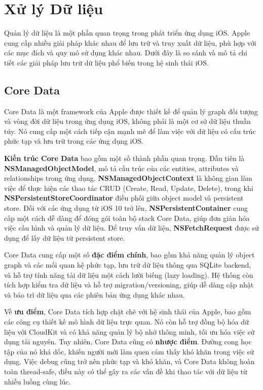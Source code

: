 \section{Xử lý Dữ liệu}

\hspace*{0.8cm}Quản lý dữ liệu là một phần quan trọng trong phát triển ứng dụng iOS. Apple cung cấp nhiều giải pháp khác nhau để lưu trữ và truy xuất dữ liệu, phù hợp với các mục đích và quy mô sử dụng khác nhau. Dưới đây là so sánh và mô tả chi tiết các giải pháp lưu trữ dữ liệu phổ biến trong hệ sinh thái iOS.


\subsection{Core Data}
Core Data\cite{Core-Data} là một framework của Apple được thiết kế để quản lý graph đối tượng và vòng đời dữ liệu trong ứng dụng iOS, không phải là một cơ sở dữ liệu thuần túy. Nó cung cấp một cách tiếp cận mạnh mẽ để làm việc với dữ liệu có cấu trúc phức tạp và lưu trữ trong các ứng dụng iOS.

\textbf{Kiến trúc Core Data} bao gồm một số thành phần quan trọng. Đầu tiên là \textbf{NSManagedObjectModel}, mô tả cấu trúc của các entities, attributes và relationships trong ứng dụng. \textbf{NSManagedObjectContext} là không gian làm việc để thực hiện các thao tác CRUD (Create, Read, Update, Delete), trong khi \textbf{NSPersistentStoreCoordinator} điều phối giữa object model và persistent store. Đối với các ứng dụng từ iOS 10 trở lên, \textbf{NSPersistentContainer} cung cấp một cách dễ dàng để đóng gói toàn bộ stack Core Data, giúp đơn giản hóa việc cấu hình và quản lý dữ liệu. Để truy vấn dữ liệu, \textbf{NSFetchRequest} được sử dụng để lấy dữ liệu từ persistent store.

Core Data cung cấp một số \textbf{đặc điểm chính}, bao gồm khả năng quản lý object graph và các mối quan hệ phức tạp, lưu trữ dữ liệu thông qua SQLite backend, và hỗ trợ tính năng tải dữ liệu một cách lười biếng (lazy loading). Hệ thống còn tích hợp kiểm tra dữ liệu và hỗ trợ migration/versioning, giúp dễ dàng cập nhật và bảo trì dữ liệu qua các phiên bản ứng dụng khác nhau.

Về \textbf{ưu điểm}, Core Data tích hợp chặt chẽ với hệ sinh thái của Apple, bao gồm các công cụ thiết kế mô hình dữ liệu trực quan. Nó còn hỗ trợ đồng bộ hóa dữ liệu với CloudKit và có khả năng quản lý bộ nhớ thông minh, tối ưu hóa việc sử dụng tài nguyên.
Tuy nhiên, Core Data cũng có \textbf{nhược điểm}. Đường cong học tập của nó khá dốc, khiến người mới làm quen cảm thấy khó khăn trong việc sử dụng. Việc debug cũng trở nên phức tạp và khó khăn, và Core Data không hoàn toàn thread-safe, điều này có thể gây ra các vấn đề khi thao tác với dữ liệu từ nhiều luồng cùng lúc.

